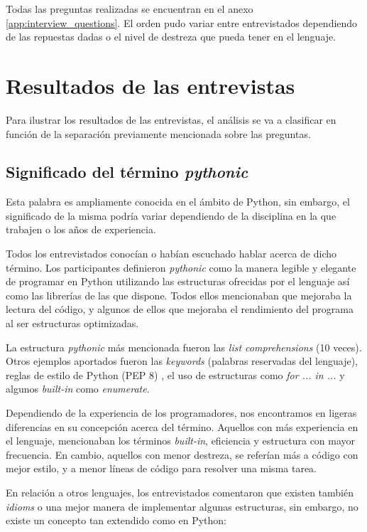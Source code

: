 \documentclass[a4paper, 12pt]{book}
\begin{document}
Todas las preguntas realizadas se encuentran en el anexo \ref{app:interview_questions}. El orden pudo variar entre entrevistados dependiendo de las repuestas dadas o el nivel de destreza que pueda tener en el lenguaje.


\section{Resultados de las entrevistas}


Para ilustrar los resultados de las entrevistas, el análisis se va a clasificar en función de la separación previamente mencionada sobre las preguntas.


\subsection{Significado del término \textit{pythonic}}

Esta palabra es ampliamente conocida en el ámbito de Python, sin embargo, el significado de la misma podría variar dependiendo de la disciplina en la que trabajen o los años de experiencia.

Todos los entrevistados conocían o habían escuchado hablar acerca de dicho término. Los participantes definieron \textit{pythonic} como la manera legible y elegante de programar en Python utilizando las estructuras ofrecidas por el lenguaje así como las librerías de las que dispone. Todos ellos mencionaban que mejoraba la lectura del código, y algunos de ellos que mejoraba el rendimiento del programa al ser estructuras optimizadas.

La estructura \textit{pythonic} más mencionada fueron las \textit{list comprehensions} (10 veces). Otros ejemplos aportados fueron las \textit{keywords} (palabras reservadas del lenguaje), reglas de estilo de Python (PEP 8) \cite{van2001pep}, el uso de estructuras como \textit{for ... in ...} y algunos \textit{built-in} como \textit{enumerate}.

Dependiendo de la experiencia de los programadores, nos encontramos en ligeras diferencias en su concepción acerca del término. Aquellos con más experiencia en el lenguaje, mencionaban los términos \textit{built-in}, eficiencia y estructura con mayor frecuencia. En cambio, aquellos con menor destreza, se referían más a código con mejor estilo, y a menor líneas de código para resolver una misma tarea.

En relación a otros lenguajes, los entrevistados comentaron que existen también \textit{idioms} o una mejor manera de implementar algunas estructuras, sin embargo, no existe un concepto tan extendido como en Python:
\end{document}
